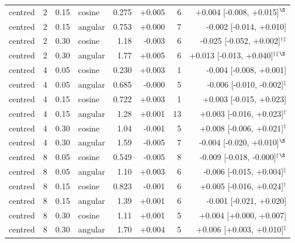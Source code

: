 \begin{tabular}{lrrlrrrr}
centred & 2 & 0.15 & cosine & 0.275 & +0.005 & 6 & +0.004 [-0.008, +0.015]$^{\S}$ \\
centred & 2 & 0.15 & angular & 0.753 & +0.000 & 7 & -0.002 [-0.014, +0.010] \\
centred & 2 & 0.30 & cosine & 1.18 & -0.003 & 6 & -0.025 [-0.052, +0.002]$^{\dagger}$$^{\ddagger}$ \\
centred & 2 & 0.30 & angular & 1.77 & +0.005 & 6 & +0.013 [-0.013, +0.040]$^{\dagger}$$^{\ddagger}$$^{\S}$ \\
centred & 4 & 0.05 & cosine & 0.230 & +0.003 & 1 & -0.004 [-0.008, +0.001] \\
centred & 4 & 0.05 & angular & 0.685 & -0.000 & 5 & -0.006 [-0.010, -0.002]$^{\ddagger}$ \\
centred & 4 & 0.15 & cosine & 0.722 & +0.003 & 1 & +0.003 [-0.015, +0.023] \\
centred & 4 & 0.15 & angular & 1.28 & +0.001 & 13 & +0.003 [-0.016, +0.023]$^{\dagger}$ \\
centred & 4 & 0.30 & cosine & 1.04 & -0.001 & 5 & +0.008 [-0.006, +0.021]$^{\ddagger}$ \\
centred & 4 & 0.30 & angular & 1.59 & -0.005 & 7 & -0.004 [-0.020, +0.010]$^{\S}$ \\
centred & 8 & 0.05 & cosine & 0.549 & -0.005 & 8 & -0.009 [-0.018, -0.000]$^{\ddagger}$$^{\S}$ \\
centred & 8 & 0.05 & angular & 1.10 & +0.003 & 6 & -0.006 [-0.015, +0.004]$^{\ddagger}$ \\
centred & 8 & 0.15 & cosine & 0.823 & -0.001 & 6 & +0.005 [-0.016, +0.024]$^{\dagger}$ \\
centred & 8 & 0.15 & angular & 1.39 & +0.001 & 6 & -0.001 [-0.021, +0.020] \\
centred & 8 & 0.30 & cosine & 1.11 & +0.001 & 5 & +0.004 [+0.000, +0.007] \\
centred & 8 & 0.30 & angular & 1.70 & +0.004 & 5 & +0.006 [+0.003, +0.010]$^{\ddagger}$ \\
\bottomrule
\end{tabular}
